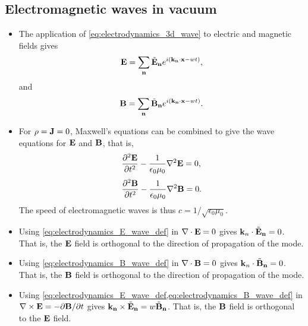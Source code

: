 \documentclass[11pt]{article}
\begin{document}
\subsection{Electromagnetic waves in vacuum}
\begin{itemize}
    \item The application of \cref{eq:electrodynamics_3d_wave} to electric and magnetic fields gives 
    \begin{equation}
        \label{eq:electrodynamics_E_wave_def}
        \mathbf{E} = \sum_{\mathbf{n}} \tilde{\mathbf{E}}_{\mathbf{n}} e^{i \left ( \mathbf{k}_{\mathbf{n}} \cdot \mathbf{x} - wt \right )},
    \end{equation}
    and 
    \begin{equation}
        \label{eq:electrodynamics_B_wave_def}
        \mathbf{B} = \sum_{\mathbf{n}} \tilde{\mathbf{B}}_{\mathbf{n}} e^{i \left ( \mathbf{k}_{\mathbf{n}} \cdot \mathbf{x} - wt \right )}.
    \end{equation}
    \item For $\rho = \mathbf{J} = 0$, Maxwell's equations can be combined to give the wave equations for $\mathbf{E}$ and $\mathbf{B}$, that is,
    \begin{equation}
        \label{eq:electrodynamics_E_wave_eq}
        \frac{\partial^2 \mathbf{E}}{\partial t^2} - \frac{1}{\epsilon_0 \mu_0} \nabla^2 \mathbf{E} = 0,
    \end{equation}
    \begin{equation}
        \label{eq:electrodynamics_B_wave_eq}
        \frac{\partial^2 \mathbf{B}}{\partial t^2} - \frac{1}{\epsilon_0 \mu_0} \nabla^2 \mathbf{B} = 0.
    \end{equation}
    The speed of electromagnetic waves is thus $c=1/\sqrt{\epsilon_0 \mu_0}$.

    \item Using \cref{eq:electrodynamics_E_wave_def} in $\nabla \cdot \mathbf{E} = 0$ gives $\mathbf{k}_n \cdot \tilde{\mathbf{E}}_{\mathbf{n}} = 0$. That is, the $\mathbf{E}$ field is orthogonal to the direction of propagation of the mode.
    
    \item Using \cref{eq:electrodynamics_B_wave_def} in $\nabla \cdot \mathbf{B} = 0$ gives $\mathbf{k}_n \cdot \tilde{\mathbf{B}}_{\mathbf{n}} = 0$. That is, the $\mathbf{B}$ field is orthogonal to the direction of propagation of the mode.
    
    \item Using \cref{eq:electrodynamics_E_wave_def,eq:electrodynamics_B_wave_def} in $\nabla \times \mathbf{E} = -\partial \mathbf{B} / \partial t$ gives $\mathbf{k}_{\mathbf{n}} \times \tilde{\mathbf{E}}_{\mathbf{n}} = w \tilde{\mathbf{B}}_{\mathbf{n}}$. That is, the $\mathbf{B}$ field is orthogonal to the $\mathbf{E}$ field.

\end{itemize}
\end{document}
